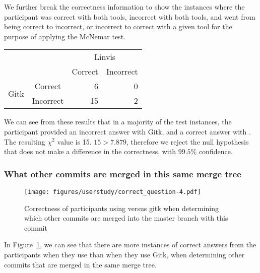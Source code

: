 



We further break the correctness information to show the instances where
the participant was correct with both tools, incorrect with both tools,
and went from being correct to incorrect, or incorrect to correct with a
given tool for the purpose of applying the McNemar test.

\begin{center}
  \begin{tabular}{cc|rr}
                           &           & \multicolumn{2}{c}{Linvis}\\
                           &           & Correct                      & Incorrect\\\hline
    \multirow{2}{*}{Gitk}  & Correct   & 6                            & 0\\
                           & Incorrect & 15                           & 2\\
  \end{tabular}
\end{center}

We can see from these results that in a majority of the test instances,
the participant provided an incorrect answer with Gitk, and a correct
answer with \tool. The resulting $\chi^2$ value is 15. $15 > 7.879$,
therefore we reject the null hypothesis that \tool does not make a
difference in the correctness, with $99.5\%$ confidence.

\subsubsection{What other commits are merged in this same merge tree}
\label{ssub:what_other_commits_are_merged_in_this_same_merge_tree}

\begin{figure}[htpb]
  \centering
  \texttt{[image: figures/userstudy/correct\_question-4.pdf]}
  \caption{Correctness of participants using \tool versus gitk when
    determining which other commits are merged into the master branch
    with this commit}
  \label{fig:q_4_correctness}
\end{figure}

In Figure~\ref{fig:q_4_correctness}, we can see that there are more
instances of correct answers from the participants when they use \tool
than when they use Gitk, when determining other commits that are merged
in the same merge tree.

